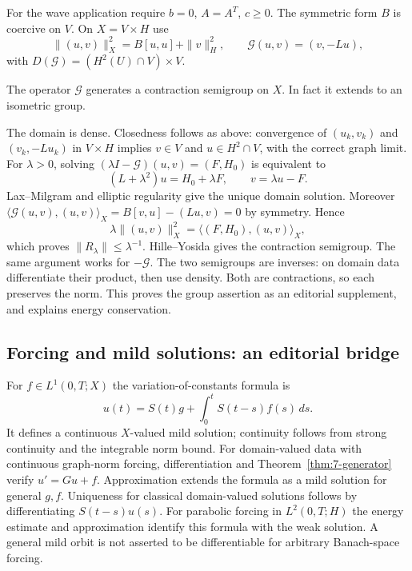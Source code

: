 For the wave application require $b=0$, $A=A^T$, $c\geq0$.
The symmetric form $B$ is coercive on $V$. On
$X=V\times H$ use
\[
 \|(u,v)\|_X^2=B[u,u]+\|v\|_H^2,\qquad
 \mathcal G(u,v)=(v,-Lu),
\]
with $D(\mathcal G)=(H^2(U)\cap V)\times V$.
\Needspace{55mm}
\begin{theorem}
The operator $\mathcal G$ generates a contraction semigroup on $X$.
In fact it extends to an isometric group.
\end{theorem}
\begin{expandedproof}
The domain is dense. Closedness follows as above: convergence of
$(u_k,v_k)$ and $(v_k,-Lu_k)$ in $V\times H$ implies $v\in V$ and
$u\in H^2\cap V$, with the correct graph limit.
For $\lambda>0$, solving $(\lambda I-\mathcal G)(u,v)=(F,H_0)$ is
 equivalent to
\[
 (L+\lambda^2)u=H_0+\lambda F,\qquad v=\lambda u-F.
\]
Lax--Milgram and elliptic regularity give the unique domain solution.
Moreover $\langle\mathcal G(u,v),(u,v)\rangle_X
=B[v,u]-(Lu,v)=0$ by symmetry. Hence
\[
 \lambda\|(u,v)\|_X^2
 =\langle(F,H_0),(u,v)\rangle_X,
\]
which proves $\|R_\lambda\|\leq\lambda^{-1}$.
Hille--Yosida gives the contraction semigroup.
The same argument works for $-\mathcal G$. The two semigroups are
inverses: on domain data differentiate their product, then use density.
Both are contractions, so each preserves the norm. This proves the group
assertion as an editorial supplement, and explains energy conservation.
\end{expandedproof}
\Needspace{55mm}

\Needspace{55mm}
\subsection{Forcing and mild solutions: an editorial bridge}
For $f\in L^1(0,T;X)$ the variation-of-constants formula is
\[
 u(t)=S(t)g+\int_0^tS(t-s)f(s)\,ds.
\]
It defines a continuous $X$-valued mild solution; continuity follows from
strong continuity and the integrable norm bound.
For domain-valued data with continuous graph-norm forcing,
differentiation and Theorem~\ref{thm:7-generator} verify $u'=Gu+f$.
Approximation extends the formula as a mild solution for general $g,f$.
Uniqueness for classical domain-valued solutions follows by differentiating
$S(t-s)u(s)$. For parabolic forcing in $L^2(0,T;H)$ the energy estimate
and approximation identify this formula with the weak solution. A general
mild orbit is not asserted to be differentiable for arbitrary Banach-space
forcing.
